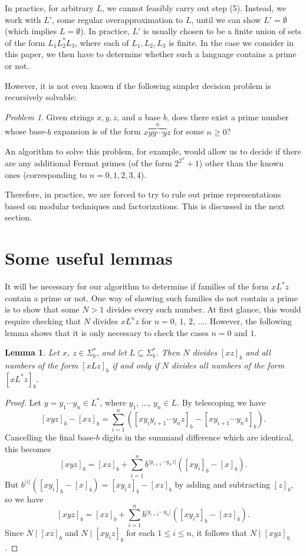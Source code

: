 \documentclass[12pt]{article}
\theoremstyle{plain}
\newtheorem{lemma}[theorem]{Lemma}
\theoremstyle{definition}
\theoremstyle{remark}
\newtheorem{problem}[theorem]{Problem}
\newcommand{\0}{\mathtt{0}}
\newcommand{\1}{\mathtt{1}}
\newcommand{\2}{\mathtt{2}}
\newcommand{\3}{\mathtt{3}}
\newcommand{\4}{\mathtt{4}}
\newcommand{\5}{\mathtt{5}}
\newcommand{\6}{\mathtt{6}}
\newcommand{\7}{\mathtt{7}}
\newcommand{\8}{\mathtt{8}}
\newcommand{\9}{\mathtt{9}}
\begin{document}
In practice, for arbitrary $L$,
we cannot feasibly carry out step (5).  Instead, we work
with $L'$, some regular overapproximation to $L$, until we can show $L' =
\emptyset$ (which implies $L = \emptyset$).  In practice,
$L'$ is usually chosen to be a finite union of sets of the form 
$L_1 L_2^* L_3$, where each of $L_1, L_2, L_3$ is finite.
In the case we consider in this paper,
we then have to determine whether such a language contains
a prime or not.

However, it is not even known if the following simpler decision problem is 
recursively solvable:

\medskip

\begin{problem}
Given strings $x, y, z$, and a base $b$, does there exist a prime
number whose base-$b$ expansion is of the form $x \overbrace{yy\cdots y}^n z$
for some $n \geq 0$?
\end{problem}

\medskip

An algorithm to solve this problem, for example, would allow us to decide
if there are any additional Fermat primes (of the form $2^{2^n}+1$)
other than the known ones (corresponding to $n = 0,1,2,3,4$).

Therefore, in practice, we are forced to try to rule out prime
representations based on modular techniques and factorizations.
This is discussed in the next section.

\section{Some useful lemmas}
It will be necessary for our algorithm to determine if families of the
form $xL^*z$ contain a prime or not.  One way of showing such families
do not contain a prime is to show that some $N>1$ 
divides every such number.  At first glance, this would require
checking that $N$ divides $xL^nz$ for $n=0$, $1$, $2$, $\dotsc$.
However, the following lemma shows that it is only necessary to check
the cases $n=0$ and $1$.

\begin{lemma}\label{lemone}
Let $x$, $z\in \Sigma^*_b$, and let $L\subseteq\Sigma^*_b$.
Then $N$ divides $[xz]_b$ and all numbers of the form $[xLz]_b$
if and only if $N$ divides all numbers of the form $[xL^*z]_b$.
\end{lemma}
\begin{proof}
Let $y=y_1\dotsm y_n\in L^*$, where $y_1$, $\dotsc$, $y_n\in L$.  
By telescoping we have
\[ [xyz]_b - [xz]_b = \sum_{i=1}^{n}([xy_{i}y_{i+1}\dotsm y_n z]_b-[xy_{i+1}\dotsm y_n z]_b) . \]
Cancelling the final base-$b$ digits in the summand difference 
which are identical, this becomes
\[ [xyz]_b = [xz]_b + \sum_{i=1}^{n}b^{\lvert{y_{i+1}\dotsm y_n z}\rvert}([xy_i]_b-[x]_b) . \]
But $b^{\lvert z\rvert}([xy_i]_b-[x]_b)=[xy_iz]_b-[xz]_b$ by 
adding and subtracting $[z]_b$, so we have
\[ [xyz]_b = [xz]_b + \sum_{i=1}^{n}b^{\vert{y_{i+1}\dotsm y_n}\rvert}([xy_iz]_b-[xz]_b) . \]
Since $N\mid[xz]_b$ and $N\mid[xy_iz]_b$ for each $1\leq i\leq n$,
 it follows that $N\mid[xyz]_b$.
\end{proof}
\end{document}

